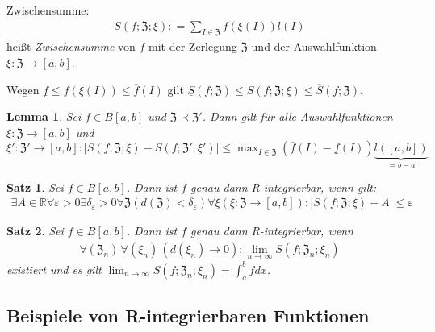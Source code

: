 \documentclass[ngerman,titlepage,twoside, parskip=half*]{scrreprt}
\newcommand*{\R}{\mathbb{R}}
\newcommand*{\ZZ}{\mathfrak{Z}}
\theoremstyle{plain}
\newtheorem{lemma}{Lemma}
\newtheorem{theorem}{Satz}[section]
\theoremstyle{definition}
\theoremstyle{remark}
\newcommand*{\abs}[2][]{#1\lvert#2#1\rvert}
\newcommand*{\coloneqq}{\mathrel{\mathop:}=}
\begin{document}
Zwischensumme:
\begin{gather*}S(f;\ZZ;\xi)\coloneqq\sum_{I\in\ZZ} f(\xi(I)) l(I)\end{gather*}
heißt \emph{Zwischensumme} von $f$ mit der Zerlegung
$\ZZ$ und der Auswahlfunktion $\xi\colon\ZZ\rightarrow[a,b]$.

Wegen $\underline{f}\leq f(\xi(I))\leq\overline{f}(I)$ gilt $\underline{S}
(f;\ZZ)\leq S(f;\ZZ;\xi)\leq\overline{S}(f;\ZZ)$.

\begin{lemma}
  Sei $f\in B[a,b]$ und $\ZZ\prec\ZZ'$. Dann gilt für alle Auswahlfunktionen
  $\xi\colon\ZZ\rightarrow[a,b]$ und $\xi'\colon\ZZ'\rightarrow
  [a,b]\colon \abs{S(f;\ZZ;\xi)
  -S(f;\ZZ';\xi')}\leq\max_{I\in\ZZ} (\overline{f}(I)-\underline{f}(I))
  \underbrace{l([a,b])}_{=b-a}$
\end{lemma}

\begin{theorem}
  Sei $f\in B[a,b]$. Dann ist $f$ genau dann R-integrierbar, wenn gilt:
  \begin{gather*}\exists A\in\R \forall\varepsilon>0 \exists\delta_\varepsilon>0
  \forall\ZZ(d(\ZZ)<\delta_\varepsilon) \forall \xi(\xi\colon\ZZ\rightarrow
  [a,b])\colon\abs{S(f;\ZZ;\xi)-A}\leq \varepsilon\end{gather*}
\end{theorem}

\begin{theorem}
  Sei $f\in B[a,b]$. Dann ist $f$ genau dann R-integrierbar, wenn
  \begin{gather*}\forall (\ZZ_n)\,\forall (\xi_n)\,(d(\xi_n)\rightarrow 0)\colon
  \lim_{n\rightarrow\infty} S(f;\ZZ_n;\xi_n)\end{gather*}
  existiert und es gilt $\lim_{n\rightarrow\infty} S(f;\ZZ_n;\xi_n)=\int_a^b
  fdx$.
\end{theorem}

\subsection{Beispiele von R-integrierbaren Funktionen}
\end{document}
